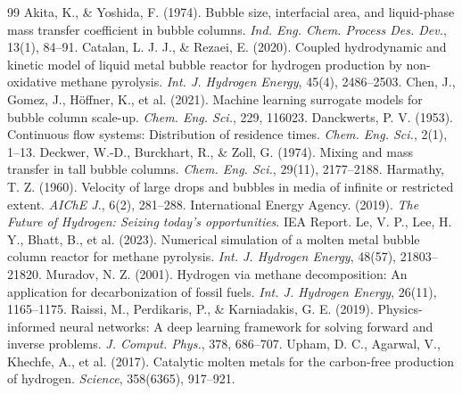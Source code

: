 \documentclass[12pt,a4paper,oneside]{report}
\begin{document}
\begin{thebibliography}{99}
 Akita, K., \& Yoshida, F. (1974). Bubble size, interfacial area, and liquid-phase mass transfer coefficient in bubble columns. \textit{Ind. Eng. Chem. Process Des. Dev.}, 13(1), 84--91.
 Catalan, L. J. J., \& Rezaei, E. (2020). Coupled hydrodynamic and kinetic model of liquid metal bubble reactor for hydrogen production by non-oxidative methane pyrolysis. \textit{Int. J. Hydrogen Energy}, 45(4), 2486--2503.
 Chen, J., Gomez, J., Höffner, K., et al. (2021). Machine learning surrogate models for bubble column scale-up. \textit{Chem. Eng. Sci.}, 229, 116023.
 Danckwerts, P. V. (1953). Continuous flow systems: Distribution of residence times. \textit{Chem. Eng. Sci.}, 2(1), 1--13.
 Deckwer, W.-D., Burckhart, R., \& Zoll, G. (1974). Mixing and mass transfer in tall bubble columns. \textit{Chem. Eng. Sci.}, 29(11), 2177--2188.
 Harmathy, T. Z. (1960). Velocity of large drops and bubbles in media of infinite or restricted extent. \textit{AIChE J.}, 6(2), 281--288.
 International Energy Agency. (2019). \textit{The Future of Hydrogen: Seizing today's opportunities}. IEA Report.
 Le, V. P., Lee, H. Y., Bhatt, B., et al. (2023). Numerical simulation of a molten metal bubble column reactor for methane pyrolysis. \textit{Int. J. Hydrogen Energy}, 48(57), 21803--21820.
 Muradov, N. Z. (2001). Hydrogen via methane decomposition: An application for decarbonization of fossil fuels. \textit{Int. J. Hydrogen Energy}, 26(11), 1165--1175.
 Raissi, M., Perdikaris, P., \& Karniadakis, G. E. (2019). Physics-informed neural networks: A deep learning framework for solving forward and inverse problems. \textit{J. Comput. Phys.}, 378, 686--707.
 Upham, D. C., Agarwal, V., Khechfe, A., et al. (2017). Catalytic molten metals for the carbon-free production of hydrogen. \textit{Science}, 358(6365), 917--921.
\end{thebibliography}
\end{document}

